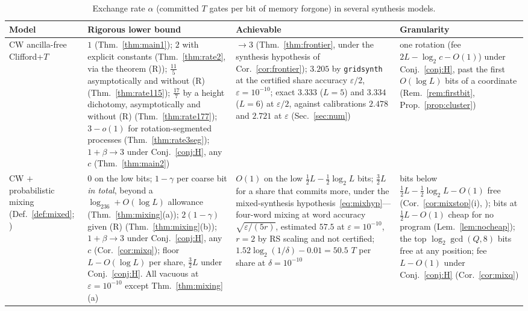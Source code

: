 \documentclass[aps,prx,twocolumn,superscriptaddress,nofootinbib,longbibliography]{revtex4-2}
\theoremstyle{plain}
\theoremstyle{definition}
\theoremstyle{remark}
\begin{document}
\begin{table}[t]
\centering\small
\caption{Exchange rate $\alpha$ (committed $T$ gates per bit of memory forgone) in several synthesis models.}
\label{tab:models}
\begin{tabular}{@{}p{3.6cm} p{5.2cm} p{4.6cm} p{3.4cm}@{}}
\toprule
\raggedright Model & \raggedright Rigorous lower bound & \raggedright Achievable & \raggedright Granularity\tabularnewline
\midrule
\raggedright CW ancilla-free Clifford+$T$ & \raggedright $1$ (Thm.~\ref{thm:main1}); $2$ with explicit constants (Thm.~\ref{thm:rate2}, via the theorem (R)); $\tfrac{11}5$ asymptotically and without (R) (Thm.~\ref{thm:rate115}); $\tfrac{17}7$ by a height dichotomy, asymptotically and without (R) (Thm.~\ref{thm:rate177}); $3-o(1)$ for rotation-segmented processes (Thm.~\ref{thm:rate3seg}); $1+\beta\to3$ under Conj.~\ref{conj:H}, any $c$ (Thm.~\ref{thm:main2}) & \raggedright $\to3$ (Thm.~\ref{thm:frontier}, under the synthesis hypothesis of Cor.~\ref{cor:frontier}); $3.205$ by \texttt{gridsynth} at the certified share accuracy $\varepsilon/2$, $\varepsilon=10^{-10}$; exact $3.333$ ($L=5$) and $3.334$ ($L=6$) at $\varepsilon/2$, against calibrations $2.478$ and $2.721$ at $\varepsilon$ (Sec.~\ref{sec:num}) & \raggedright one rotation (fee $2L-\log_2c-O(1)$) under Conj.~\ref{conj:H}, past the first $O(\log L)$ bits of a coordinate (Rem.~\ref{rem:firstbit}, Prop.~\ref{prop:cluster})\tabularnewline
\raggedright CW $+$ probabilistic mixing (Def.~\ref{def:mixed}; \cite{Campbell17,Hastings17,KLMPP,Bothe}) & \raggedright $0$ on the low bits; $1-\gamma$ per coarse bit \emph{in total}, beyond a $\log_236+O(\log L)$ allowance (Thm.~\ref{thm:mixing}(a)); $2(1-\gamma)$ given (R) (Thm.~\ref{thm:mixing}(b)); $1+\beta\to3$ under Conj.~\ref{conj:H}, any $c$ (Cor.~\ref{cor:mixq}); floor $L-O(\log L)$ per share, $\tfrac32L$ under Conj.~\ref{conj:H}. All vacuous at $\varepsilon=10^{-10}$ except Thm.~\ref{thm:mixing}(a) & \raggedright $O(1)$ on the low $\tfrac12L-\tfrac12\log_2L$ bits; $\tfrac32L$ for a share that commits more, under the mixed-synthesis hypothesis~\eqref{eq:mixhyp}---four-word mixing \cite[Thm.~2]{Campbell17} at word accuracy $\sqrt{\varepsilon/(5r)}$, estimated $57.5$ at $\varepsilon=10^{-10}$, $r=2$ by RS scaling and not certified; $1.52\log_2(1/\delta)-0.01=50.5$ $T$ per share at $\delta=10^{-10}$ \cite{KLMPP,Bothe} & \raggedright bits below $\tfrac12L-\tfrac12\log_2L-O(1)$ free (Cor.~\ref{cor:mixstop}(i), \cite{Bothe}); bits at $\tfrac12L-O(1)$ cheap for no program (Lem.~\ref{lem:nocheap}); the top $\log_2\gcd(Q,8)$ bits free at any position; fee $L-O(1)$ under Conj.~\ref{conj:H} (Cor.~\ref{cor:mixq})\tabularnewline

\end{tabular}
\end{table}
\end{document}
